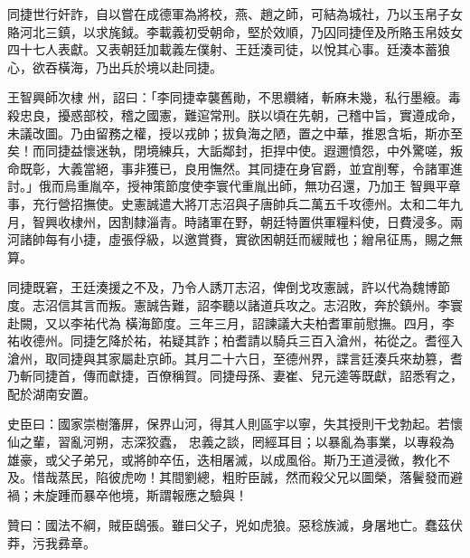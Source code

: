 \begin{pinyinscope}
 同捷世行奸詐，自以嘗在成德軍為將校，燕、趙之師，可結為城社，乃以玉帛子女賂河北三鎮，以求旄鉞。李載義初受朝命，堅於效順，乃囚同捷侄及所賂玉帛妓女四十七人表獻。又表朝廷加載義左僕射、王廷湊司徒，以悅其心事。廷湊本蓄狼心，欲吞橫海，乃出兵於境以赴同捷。



 王智興師次棣
 州，詔曰：「李同捷幸襲舊勛，不思纘緒，斬麻未幾，私行墨縗。毒殺忠良，擾惑部校，稽之國憲，難逭常刑。朕以頃在先朝，己稽中旨，實遵成命，未議改圖。乃由留務之權，授以戎帥；拔負海之陋，置之中華，推恩含垢，斯亦至矣！而同捷益懷迷執，閉境練兵，大詬鄰封，拒捍中使。遐邇憤怨，中外驚嗟，叛命既彰，大義當絕，事非獲已，良用憮然。其同捷在身官爵，並宜削奪，令諸軍進討。」俄而烏重胤卒，授神策節度使李寰代重胤出師，無功召還，乃加王
 智興平章事，充行營招撫使。史憲誠遣大將丌志沼與子唐帥兵二萬五千攻德州。太和二年九月，智興收棣州，因割隸淄青。時諸軍在野，朝廷特置供軍糧料使，日費浸多。兩河諸帥每有小捷，虛張俘級，以邀賞賚，實欲困朝廷而緩賊也；繒帛征馬，賜之無算。



 同捷既窘，王廷湊援之不及，乃令人誘丌志沼，俾倒戈攻憲誠，許以代為魏博節度。志沼信其言而叛。憲誠告難，詔李聽以諸道兵攻之。志沼敗，奔於鎮州。李寰赴闕，又以李祐代為
 橫海節度。三年三月，詔諫議大夫柏耆軍前慰撫。四月，李祐收德州。同捷乞降於祐，祐疑其詐；柏耆請以騎兵三百入滄州，祐從之。耆徑入滄州，取同捷與其家屬赴京師。其月二十六日，至德州界，諜言廷湊兵來劫篡，耆乃斬同捷首，傳而獻捷，百僚稱賀。同捷母孫、妻崔、兒元逵等既獻，詔悉宥之，配於湖南安置。



 史臣曰：國家崇樹籓屏，保界山河，得其人則區宇以寧，失其授則干戈勃起。若懷仙之輩，習亂河朔，志深狡蠹，
 忠義之談，罔經耳目；以暴亂為事業，以專殺為雄豪，或父子弟兄，或將帥卒伍，迭相屠滅，以成風俗。斯乃王道浸微，教化不及。惜哉蒸民，陷彼虎吻！其間劉總，粗貯臣誠，然而殺父兄以圖榮，落鬢發而避禍；未旋踵而暴卒他境，斯謂報應之驗與！



 贊曰：國法不綱，賊臣鴟張。雖曰父子，兇如虎狼。惡稔族滅，身屠地亡。蠢茲伏莽，污我彞章。



\end{pinyinscope}